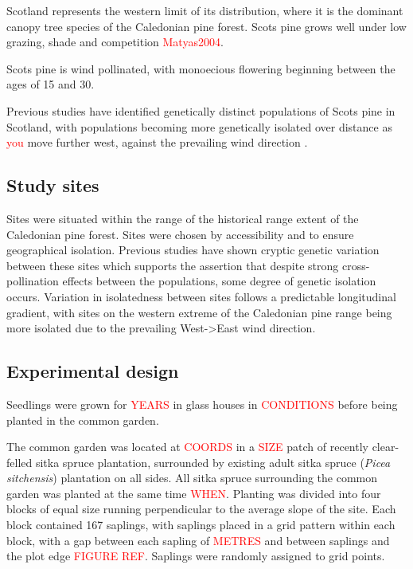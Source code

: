\documentclass[a4paper, 11pt]{article}
\newcommand{\todo}[1]{\textcolor{red}{#1}}   %
\begin{document}
Scotland represents the western limit of its distribution, where it is the dominant canopy tree species of the Caledonian pine forest. Scots pine grows well under low grazing, shade and competition \todo{Matyas2004}. 

Scots pine is wind pollinated, with monoecious flowering beginning between the ages of 15 and 30. 

Previous studies have identified genetically distinct populations of Scots pine in Scotland, with populations becoming more genetically isolated over distance as \todo{you} move further west, against the prevailing wind direction \citep{}. 

\subsection*{Study sites}

Sites were situated within the range of the historical range extent of the Caledonian pine forest. Sites were chosen by accessibility and to ensure geographical isolation. Previous studies have shown cryptic genetic variation between these sites \citep{Donnelly2018} which supports the assertion that despite strong cross-pollination effects between the populations, some degree of genetic isolation occurs. Variation in isolatedness between sites follows a predictable longitudinal gradient, with sites on the western extreme of the Caledonian pine range being more isolated due to the prevailing West->East wind direction.

\subsection*{Experimental design}

Seedlings were grown for \todo{YEARS} in glass houses in \todo{CONDITIONS} before being planted in the common garden.

The common garden was located at \todo{COORDS} in a \todo{SIZE} patch of recently clear-felled sitka spruce plantation, surrounded by existing adult sitka spruce (\textit{Picea sitchensis}) plantation on all sides. All sitka spruce surrounding the common garden was planted at the same time \todo{WHEN}. Planting was divided into four blocks of equal size running perpendicular to the average slope of the site. Each block contained 167 saplings, with saplings placed in a grid pattern within each block, with a gap between each sapling of \todo{METRES} and between saplings and the plot edge \todo{FIGURE REF}. Saplings were randomly assigned to grid points.
\end{document}
